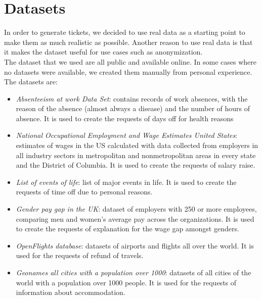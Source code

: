 \documentclass{article}
\begin{document}
\section{Datasets}
In order to generate tickets, we decided to use real data as a starting point to make them as much realistic as possible. Another reason to use real data is that it makes the dataset useful for use cases such as anonymization. \\
The dataset that we used are all public and available online. In some cases where no datasets were available, we created them manually from personal experience. \\
The datasets are:
\begin{itemize}
    \item \textit{Absenteeism at work Data Set}: contains records of work absences, with the reason of the absence (almost always a disease) and the number of hours of absence. It is used to create the requests of days off for health reasons
    \item \textit{National Occupational Employment and Wage Estimates United States}: estimates of wages in the US calculated with data collected from employers in all industry sectors in metropolitan and nonmetropolitan areas in every state and the District of Columbia. It is used to create the requests of salary raise.
    \item \textit{List of events of life}: list of major events in life. It is used to create the requests of time off due to personal reasons. 
    \item \textit{Gender pay gap in the UK}: dataset of employers with 250 or more employees, comparing men and women’s average pay across the organizations. It is used to create the requests of explanation for the wage gap amongst genders.
    \item \textit{OpenFlights database}: datasets of airports and flights all over the world. It is used for the requests of refund of travels.
    \item \textit{Geonames all cities with a population over 1000}: datasets of all cities of the world with a population over 1000 people. It is used for the requests of information about accommodation.
\end{itemize}
\end{document}
